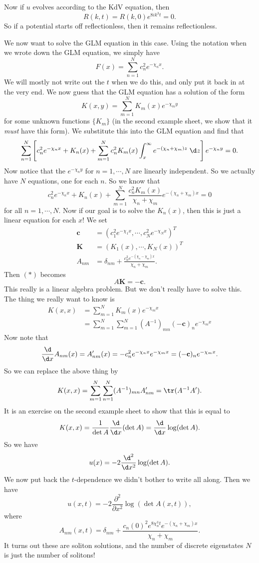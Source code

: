 \documentclass[a4paper]{article}
\begin{document}
Now if $u$ evolves according to the KdV equation, then
\[
  R(k, t) = R(k, 0) e^{8ik^3 t} = 0.
\]
So if a potential starts off reflectionless, then it remains reflectionless.

We now want to solve the GLM equation in this case. Using the notation when we wrote down the GLM equation, we simply have
\[
  F(x) = \sum_{n = 1}^N c_n^2 e^{-\chi_n x}.
\]
We will mostly not write out the $t$ when we do this, and only put it back in at the very end. We now guess that the GLM equation has a solution of the form
\[
  K(x, y) = \sum_{m = 1}^N K_m(x) e^{-\chi_m y}
\]
for some unknown functions $\{K_m\}$ (in the second example sheet, we show that it \emph{must} have this form). We substitute this into the GLM equation and find that
\[
  \sum_{n = 1}^N \left[c_n^2 e^{-\chi_n x}+ K_n(x) + \sum_{m = 1}^N c_n^2 K_m(x) \int_x^\infty e^{-(\chi_n + \chi_m)z}\;\d z\right] e^{-\chi_n y} = 0.
\]
Now notice that the $e^{-\chi_n y}$ for $n = 1, \cdots, N$ are linearly independent. So we actually have $N$ equations, one for each $n$. So we know that
\[
  c_n^2 e^{-\chi_n x} + K_n(x) + \sum_{m = 1}^N \frac{c_n^2 K_m(x)}{\chi_n + \chi_m} e^{-(\chi_n + \chi_m)x} = 0\tag{$*$}
\]
for all $n = 1, \cdots, N$. Now if our goal is to solve the $K_n(x)$, then this is just a linear equation for each $x$! We set
\begin{align*}
  \mathbf{c} &= (c_1^2 e^{-\chi_1 x}, \cdots, c_N^2 e^{-\chi_N x})^T\\
  \mathbf{K} &= (K_1(x), \cdots, K_N(x))^T\\
  A_{nm} &= \delta_{nm} + \frac{c_n^2 e^{-(\chi_n - \chi_m)x}}{\chi_n + \chi_m}.
\end{align*}
Then $(*)$ becomes
\[
  A\mathbf{K} = -\mathbf{c}.
\]
This really is a linear algebra problem. But we don't really have to solve this. The thing we really want to know is
\begin{align*}
  K(x, x) &= \sum_{m = 1}^N K_m(x) e^{-\chi_m x}\\
  &= \sum_{m = 1}^N \sum_{m = 1}^N (A^{-1})_{mn} (-\mathbf{c})_n e^{-\chi_m x}
\end{align*}
Now note that
\[
  \frac{\d}{\d x}A_{nm}(x) = A_{nm}'(x) = - c_n^2 e^{-\chi_n x} e^{-\chi_m x} = (-\mathbf{c})_n e^{-\chi_m x}.
\]
So we can replace the above thing by
\[
  K(x, x) = \sum_{m = 1}^N \sum_{n = 1}^N (A^{-1})_{mn} A'_{nm} = \tr(A^{-1}A').
\]
It is an exercise on the second example sheet to show that this is equal to
\[
  K(x, x) = \frac{1}{\det A} \frac{\d}{\d x} (\det A) = \frac{\d}{\d x} \log (\det A).
\]
So we have
\[
  u(x) = - 2 \frac{\d^2}{\d x^2} \log(\det A).
\]
We now put back the $t$-dependence we didn't bother to write all along. Then we have
\[
  u(x, t) = -2 \frac{\partial^2}{\partial x^2} \log(\det A(x, t)),
\]
where
\[
  A_{nm}(x, t) = \delta_{nm} + \frac{c_n(0)^2 e^{8\chi_n^3 t}e^{-(\chi_n + \chi_m)x}}{\chi_n + \chi_m}.
\]
It turns out these are soliton solutions, and the number of discrete eigenstates $N$ is just the number of solitons!
\end{document}
